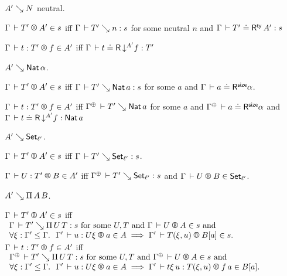 \documentclass[acmlarge,review,anonymous]{acmart}\settopmatter{printfolios=true}
\begin{document}
\begin{caselist}

\vspace{2ex}
\nextcase $A' \evalsto N$ neutral.

  \noindent
  $\LRTS{\Gamma}{T'}{A'} s$ iff
  $\Gamma \der T' \evalsto n : s$ for some neutral $n$ and
  $\Gamma \der T' \doteq \tRty\,A' : s$

  \noindent
  $\LR{\Gamma}{t}{T'}{f}{A'}$ iff
  $\Gamma \der t \doteq \tR \, \down {A'} f : T'$

\vspace{2ex}
\nextcase $A' \evalsto \Nat \alpha$.

  \noindent
  $\LRTS{\Gamma}{T'}{A'} s$ iff $\Gamma \der T' \evalsto \Nat a : s$ for some $a$ and $\LRSize \Gamma a \alpha$.

  \noindent
  $\LR{\Gamma}{t}{T'}{f}{A'}$ iff $\resurrect\Gamma \der T' \evalsto \Nat a$ for some $a$ and
  $\LRSize {\resurrect\Gamma} a \alpha$ and
  $\Gamma \der t \doteq \tR\,\down{A'} f : \Nat a$


\vspace{2ex}
\nextcase $A' \evalsto \Set[\ell']$.

  \noindent
  $\LRTS {\Gamma} {T'} {A'} s$ iff $\Gamma \der T' \evalsto \Set[\ell'] : s$.

  \noindent
  $\LR \Gamma U {T'} B {A'}$ iff
  $\resurrect\Gamma \der T' \evalsto \Set[\ell'] : s$ and $\LRT \Gamma U B {\ell'}$.

\vspace{2ex}
\nextcase $A' \evalsto \piT A B$.

\noindent
$\LRTS \Gamma {T'} {A'} s$ iff
\(
\begin{array}[t]{l}
\Gamma \der T' \evalsto \piT U T : s \mforsome U, T \mand \LRTS \Gamma U A s \mand \\
\forall \xi : \Gamma' \leq \Gamma.\ \
\LR {\Gamma'} u {U\xi} a A \implies \LRTS {\Gamma'} {T(\xi,u)} {B[a]} s
. \\
\end{array}
\) \\
$\LR \Gamma t {T'} f {A'}$ iff
\(
\begin{array}[t]{l}
\resurrect\Gamma \der T' \evalsto \piT U T : s \mforsome U, T \mand \LRTS {\resurrect\Gamma} U A s \mand \\
\forall \xi : \Gamma' \leq \Gamma.\ \
\LR {\Gamma'} u {U\xi} a A \implies \LR {\Gamma'} {t\xi\,u} {T(\xi,u)} {f\,a} {B[a]}
.
\end{array}
\)


\end{caselist}
\end{document}
